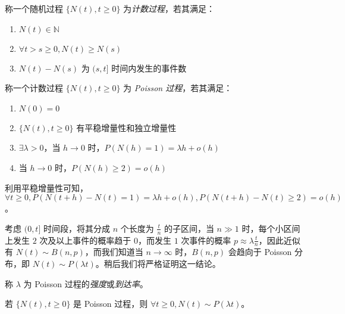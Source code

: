 \documentclass[../main.tex]{subfiles}
\begin{document}
\begin{definition}\label{def:6.3.1}
    称一个随机过程 $\{N(t),t\geq0\}$ 为\emph{计数过程}，若其满足：
    \begin{enumerate}
        \item $N(t)\in\mathbb N$
        \item $\forall t>s\geq0,N(t)\geq N(s)$
        \item $N(t)-N(s)$ 为 $(s,t]$ 时间内发生的事件数
    \end{enumerate}
\end{definition}

\begin{definition}\label{def:6.3.2}
    称一个计数过程 $\{N(t),t\geq0\}$ 为 \emph{Poisson 过程}，若其满足：
    \begin{enumerate}
        \item $N(0)=0$
        \item $\{N(t),t\geq0\}$ 有平稳增量性和独立增量性
        \item $\exists\lambda>0$，当 $h\rightarrow0$ 时，$P(N(h)=1)=\lambda h+o(h)$
        \item 当 $h\rightarrow0$ 时，$P(N(h)\geq2)=o(h)$
    \end{enumerate}
\end{definition}

利用平稳增量性可知，$\forall t\geq0,P(N(t+h)-N(t)=1)=\lambda h+o(h),P(N(t+h)-N(t)\geq2)=o(h)$。

考虑 $(0,t]$ 时间段，将其分成 $n$ 个长度为 $\frac tn$ 的子区间，当 $n\gg1$ 时，每个小区间上发生 $2$ 次及以上事件的概率趋于 $0$，而发生 $1$ 次事件的概率 $p\approx \lambda\frac tn$，因此近似有 $N(t)\sim B(n,p)$，而我们知道当 $n\rightarrow\infty$ 时，$B(n,p)$ 会趋向于 Poisson 分布，即 $N(t)\sim P(\lambda t)$。稍后我们将严格证明这一结论。

称 $\lambda$ 为 Poisson 过程的\emph{强度}或\emph{到达率}。

\begin{theorem}\label{thm:6.3.1}
    若 $\{N(t),t\geq0\}$ 是 Poisson 过程，则 $\forall t\geq0,N(t)\sim P(\lambda t)$。
\end{theorem}
\end{document}
